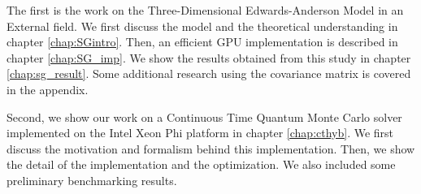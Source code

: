 The first is the work on the Three-Dimensional Edwards-Anderson Model in an External
field. We first discuss the model and the theoretical understanding in chapter 
\ref{chap:SGintro}. Then, an efficient GPU implementation is described in chapter
\ref{chap:SG_imp}. We show the results obtained from this study in chapter \ref{chap:sg_result}.
Some additional research using the covariance matrix is covered in the appendix.

Second, we show our work on a Continuous Time Quantum Monte Carlo solver implemented
on the Intel Xeon Phi platform in chapter \ref{chap:cthyb}. We first discuss the 
motivation and formalism behind this implementation. Then, we show the detail of
the implementation and the optimization. We also included some preliminary benchmarking
results.



